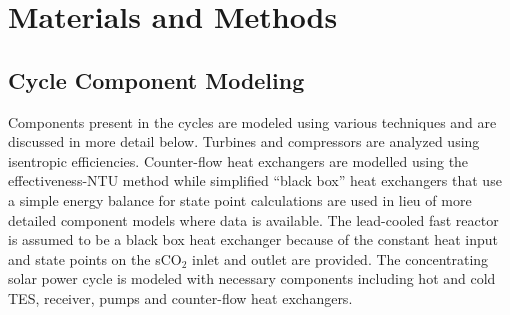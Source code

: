  
\section{Materials and Methods}






\subsection{Cycle Component Modeling}
Components present in the cycles are modeled using various techniques and are discussed in more detail below. Turbines and compressors are analyzed using isentropic efficiencies. Counter-flow heat exchangers are modelled using the effectiveness-NTU method while simplified ``black box'' heat exchangers that use a simple energy balance for state point calculations are used in lieu of more detailed component models where data is available. The lead-cooled fast reactor is assumed to be a black box heat exchanger because of the constant heat input and state points on the sCO$_2$ inlet and outlet are provided. The concentrating solar power cycle is modeled with necessary components including hot and cold TES, receiver, pumps and counter-flow heat exchangers.



